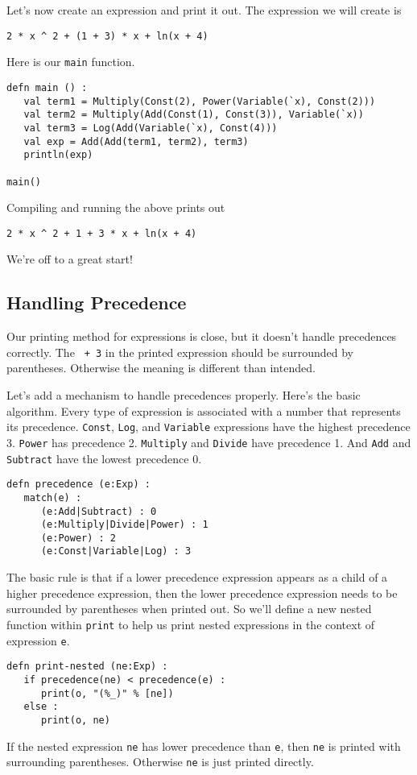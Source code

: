 \documentclass[10pt,oneside]{book}
\begin{document}
Let's now create an expression and print it out. The expression we will create is 
\begin{lstlisting}
2 * x ^ 2 + (1 + 3) * x + ln(x + 4)
\end{lstlisting} 
Here is our \texttt{\frenchspacing main} function.
\begin{lstlisting}
defn main () :
   val term1 = Multiply(Const(2), Power(Variable(`x), Const(2)))
   val term2 = Multiply(Add(Const(1), Const(3)), Variable(`x))
   val term3 = Log(Add(Variable(`x), Const(4)))
   val exp = Add(Add(term1, term2), term3)
   println(exp)   

main()
\end{lstlisting}

Compiling and running the above prints out
\begin{lstlisting}
2 * x ^ 2 + 1 + 3 * x + ln(x + 4)
\end{lstlisting}
We're off to a great start! 

\subsection*{Handling Precedence}
Our printing method for expressions is close, but it doesn't handle precedences correctly. The \texttt{ + 3} in the printed expression should be surrounded by parentheses. Otherwise the meaning is different than intended.

Let's add a mechanism to handle precedences properly. Here's the basic algorithm. Every type of expression is associated with a number that represents its precedence. \texttt{\frenchspacing Const}, \texttt{\frenchspacing Log}, and \texttt{\frenchspacing Variable} expressions have the highest precedence 3. \texttt{\frenchspacing Power} has precedence 2. \texttt{\frenchspacing Multiply} and \texttt{\frenchspacing Divide} have precedence 1. And \texttt{\frenchspacing Add} and \texttt{\frenchspacing Subtract} have the lowest precedence 0. 
\begin{lstlisting}
defn precedence (e:Exp) :
   match(e) :
      (e:Add|Subtract) : 0
      (e:Multiply|Divide|Power) : 1
      (e:Power) : 2
      (e:Const|Variable|Log) : 3
\end{lstlisting}

The basic rule is that if a lower precedence expression appears as a child of a higher precedence expression, then the lower precedence expression needs to be surrounded by parentheses when printed out. So we'll define a new nested function within \texttt{\frenchspacing print} to help us print nested expressions in the context of expression \texttt{\frenchspacing e}. 
\begin{lstlisting}
defn print-nested (ne:Exp) :
   if precedence(ne) < precedence(e) :
      print(o, "(%_)" % [ne])
   else :
      print(o, ne)
\end{lstlisting}
If the nested expression \texttt{\frenchspacing ne} has lower precedence than \texttt{\frenchspacing e}, then \texttt{\frenchspacing ne} is printed with surrounding parentheses. Otherwise \texttt{\frenchspacing ne} is just printed directly.
\end{document}
